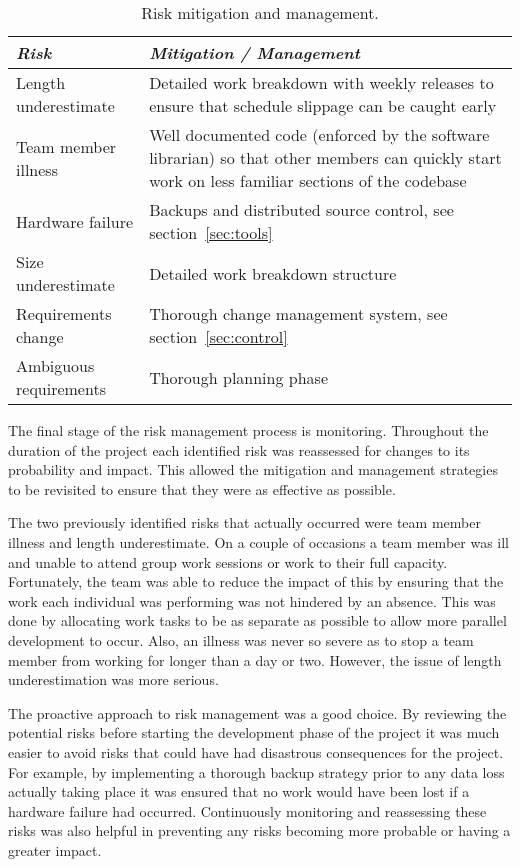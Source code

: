 \begin{table*}
	\small
	\begin{tabular}{l p{37em}}
		\toprule
		\emph{Risk} & \emph{Mitigation / Management} \\
		\midrule
		Length underestimate & Detailed work breakdown with weekly releases to ensure that
			schedule slippage can be caught early \\
		Team member illness & Well documented code (enforced by the software librarian) so
			that other members can quickly start work on less familiar sections of
			the codebase \\
		Hardware failure & Backups and distributed source control, see section~\ref{sec:tools} \\
		Size underestimate & Detailed work breakdown structure \\
		Requirements change & Thorough change management system, see section~\ref{sec:control} \\
		Ambiguous requirements & Thorough planning phase \\
		\bottomrule
	\end{tabular}
	\vspace{1.5em}
	\caption{Risk mitigation and management.}
	\label{tab:rmm}
\end{table*}
 
The final stage of the risk management process is monitoring. Throughout the duration of
the project each identified risk was reassessed for changes to its probability and
impact. This allowed the mitigation and management strategies to be revisited to ensure that
they were as effective as possible.
 
The two previously identified risks that actually occurred were team member illness and length underestimate.
On a couple of occasions a team member was ill and unable to attend group work sessions or work to their full
capacity. Fortunately, the team was able to reduce the impact of this by ensuring that the work each individual
was performing was not hindered by an absence. This was done by allocating work tasks to be as separate as
possible to allow more parallel development to occur. Also, an illness was never so severe as to stop a team
member from working for longer than a day or two. However, the issue of length underestimation was more serious.
 
%
 
The proactive approach to risk management was a good choice. By reviewing the potential
risks before starting the development phase of the project it was much easier to avoid risks that could
have had disastrous consequences for the project. For example, by implementing a thorough backup strategy
prior to any data loss actually taking place it was ensured that no work would have been lost if a hardware
failure had occurred. Continuously monitoring and reassessing these risks was also helpful in preventing
any risks becoming more probable or having a greater impact.
